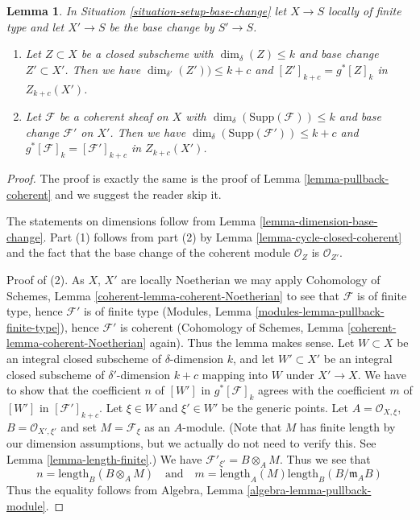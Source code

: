 \documentclass[10pt,a4paper]{amsart}
\theoremstyle{plain}
\newtheorem{lemma}[subsection]{Lemma}
\theoremstyle{definition}
\theoremstyle{remark}
\numberwithin{equation}{subsection}
\begin{document}
\begin{lemma}
\label{lemma-pullback-coherent-base-change}
In Situation \ref{situation-setup-base-change} let $X \to S$
locally of finite type and let $X' \to S$ be the base change by $S' \to S$.
\begin{enumerate}
\item Let $Z \subset X$ be a closed subscheme with
$\dim_\delta(Z) \leq k$ and base change $Z' \subset X'$. Then we have
$\dim_{\delta'}(Z')) \leq k + c$
and $[Z']_{k + c} = g^*[Z]_k$ in $Z_{k + c}(X')$.
\item Let $\mathcal{F}$ be a coherent sheaf on $X$ with
$\dim_\delta(\text{Supp}(\mathcal{F})) \leq k$ and base
change $\mathcal{F}'$ on $X'$.
Then we have $\dim_\delta(\text{Supp}(\mathcal{F}')) \leq k + c$
and $g^*[\mathcal{F}]_k = [\mathcal{F}']_{k + c}$
in $Z_{k + c}(X')$.
\end{enumerate}
\end{lemma}

\begin{proof}
The proof is exactly the same is the proof of
Lemma \ref{lemma-pullback-coherent}
and we suggest the reader skip it.

\medskip\noindent
The statements on dimensions follow from
Lemma \ref{lemma-dimension-base-change}.
Part (1) follows from part (2) by Lemma \ref{lemma-cycle-closed-coherent}
and the fact that the base change of the coherent module $\mathcal{O}_Z$
is $\mathcal{O}_{Z'}$.

\medskip\noindent
Proof of (2). As $X$, $X'$ are locally Noetherian we may apply
Cohomology of Schemes, Lemma \ref{coherent-lemma-coherent-Noetherian} to see
that $\mathcal{F}$ is of finite type, hence $\mathcal{F}'$ is
of finite type (Modules, Lemma \ref{modules-lemma-pullback-finite-type}),
hence $\mathcal{F}'$ is coherent
(Cohomology of Schemes, Lemma \ref{coherent-lemma-coherent-Noetherian} again).
Thus the lemma makes sense. Let $W \subset X$ be an integral closed
subscheme of $\delta$-dimension $k$, and let $W' \subset X'$ be
an integral closed subscheme of $\delta'$-dimension $k + c$ mapping into $W$
under $X' \to X$. We have to show that the coefficient $n$ of
$[W']$ in $g^*[\mathcal{F}]_k$ agrees with the coefficient
$m$ of $[W']$ in $[\mathcal{F}']_{k + c}$. Let $\xi \in W$ and
$\xi' \in W'$ be the generic points. Let
$A = \mathcal{O}_{X, \xi}$, $B = \mathcal{O}_{X', \xi'}$
and set $M = \mathcal{F}_\xi$ as an $A$-module. (Note that
$M$ has finite length by our dimension assumptions, but we
actually do not need to verify this. See
Lemma \ref{lemma-length-finite}.)
We have $\mathcal{F}'_{\xi'} = B \otimes_A M$.
Thus we see that
$$
n = \text{length}_B(B \otimes_A M)
\quad
\text{and}
\quad
m = \text{length}_A(M) \text{length}_B(B/\mathfrak m_AB)
$$
Thus the equality follows from
Algebra, Lemma \ref{algebra-lemma-pullback-module}.
\end{proof}
\end{document}
